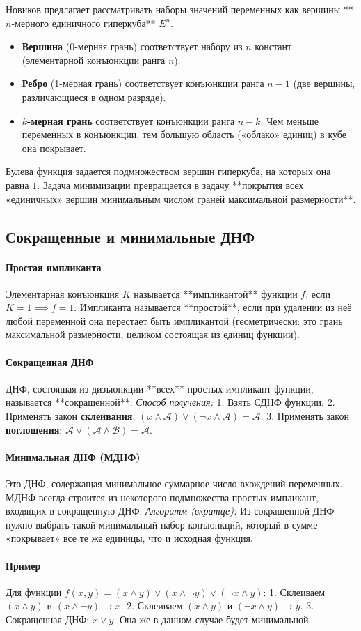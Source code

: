Новиков предлагает рассматривать наборы значений переменных как вершины **$n$-мерного единичного гиперкуба** $E^n$.
\begin{itemize}
    \item \textbf{Вершина} (0-мерная грань) соответствует набору из $n$ констант (элементарной конъюнкции ранга $n$).
    \item \textbf{Ребро} (1-мерная грань) соответствует конъюнкции ранга $n-1$ (две вершины, различающиеся в одном разряде).
    \item \textbf{$k$-мерная грань} соответствует конъюнкции ранга $n-k$. Чем меньше переменных в конъюнкции, тем большую область («облако» единиц) в кубе она покрывает.
\end{itemize}
Булева функция задается подмножеством вершин гиперкуба, на которых она равна $1$. Задача минимизации превращается в задачу **покрытия всех «единичных» вершин минимальным числом граней максимальной размерности**.

\subsection*{Сокращенные и минимальные ДНФ}

\paragraph{Простая импликанта}
Элементарная конъюнкция $K$ называется **импликантой** функции $f$, если $K=1 \implies f=1$. Импликанта называется **простой**, если при удалении из неё любой переменной она перестает быть импликантой (геометрически: это грань максимальной размерности, целиком состоящая из единиц функции).

\paragraph{Сокращенная ДНФ}
ДНФ, состоящая из дизъюнкции **всех** простых импликант функции, называется **сокращенной**.
\textit{Способ получения:}
1. Взять СДНФ функции.
2. Применять закон \textbf{склеивания}: $(x \land \mathcal{A}) \lor (\neg x \land \mathcal{A}) = \mathcal{A}$.
3. Применять закон \textbf{поглощения}: $\mathcal{A} \lor (\mathcal{A} \land \mathcal{B}) = \mathcal{A}$.

\paragraph{Минимальная ДНФ (МДНФ)}
Это ДНФ, содержащая минимальное суммарное число вхождений переменных. МДНФ всегда строится из некоторого подмножества простых импликант, входящих в сокращенную ДНФ.
\textit{Алгоритм (вкратце):} Из сокращенной ДНФ нужно выбрать такой минимальный набор конъюнкций, который в сумме «покрывает» все те же единицы, что и исходная функция.

\paragraph{Пример}
Для функции $f(x, y) = (x \land y) \lor (x \land \neg y) \lor (\neg x \land y)$:
1. Склеиваем $(x \land y)$ и $(x \land \neg y) \to x$.
2. Склеиваем $(x \land y)$ и $(\neg x \land y) \to y$.
3. Сокращенная ДНФ: $x \lor y$. Она же в данном случае будет минимальной.